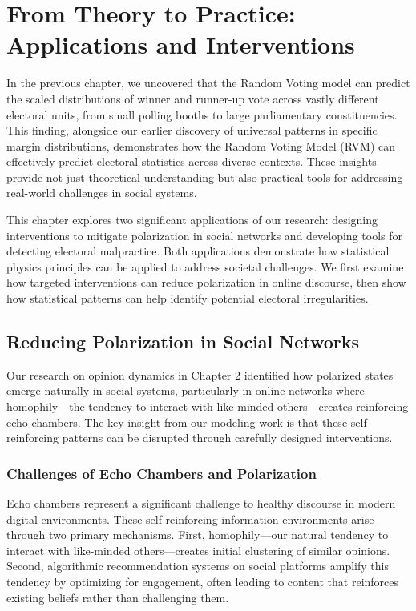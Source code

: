\chapter{From Theory to Practice: Applications and Interventions}
\label{chap7}

In the previous chapter, we uncovered that the Random Voting model can predict the scaled distributions of winner and runner-up vote across vastly different electoral units, from small polling booths to large parliamentary constituencies. This finding, alongside our earlier discovery of universal patterns in specific margin distributions, demonstrates how the Random Voting Model (RVM) can effectively predict electoral statistics across diverse contexts. These insights provide not just theoretical understanding but also practical tools for addressing real-world challenges in social systems.

This chapter explores two significant applications of our research: designing interventions to mitigate polarization in social networks and developing tools for detecting electoral malpractice. Both applications demonstrate how statistical physics principles can be applied to address societal challenges. We first examine how targeted interventions can reduce polarization in online discourse, then show how statistical patterns can help identify potential electoral irregularities. 

\section{Reducing Polarization in Social Networks}

Our research on opinion dynamics in Chapter 2 identified how polarized states emerge naturally in social systems, particularly in online networks where homophily—the tendency to interact with like-minded others—creates reinforcing echo chambers. The key insight from our modeling work is that these self-reinforcing patterns can be disrupted through carefully designed interventions.

\subsection{Challenges of Echo Chambers and Polarization}

Echo chambers represent a significant challenge to healthy discourse in modern digital environments. These self-reinforcing information environments arise through two primary mechanisms. First, homophily—our natural tendency to interact with like-minded others—creates initial clustering of similar opinions. Second, algorithmic recommendation systems on social platforms amplify this tendency by optimizing for engagement, often leading to content that reinforces existing beliefs rather than challenging them.

